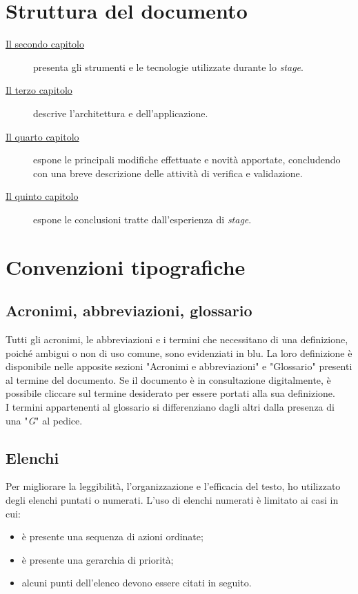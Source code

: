 \section{Struttura del documento}

\begin{description}
    \item[{\hyperref[cap:tecnologie-strumenti]{Il secondo capitolo}}] presenta gli strumenti e le tecnologie utilizzate durante lo \textit{stage}.
    
    \item[{\hyperref[cap:design]{Il terzo capitolo}}] descrive l'architettura e dell'applicazione.
    
    \item[{\hyperref[cap:codifica]{Il quarto capitolo}}] espone le principali modifiche effettuate e novità apportate, concludendo con una breve descrizione delle attività di verifica e validazione.
    
    \item[{\hyperref[cap:conclusioni]{Il quinto capitolo}}] espone le conclusioni tratte dall'esperienza di \textit{stage}.
\end{description}

\section{Convenzioni tipografiche}

\subsection{Acronimi, abbreviazioni, glossario}

Tutti gli acronimi, le abbreviazioni e i termini che necessitano di una definizione, poiché ambigui o non di uso comune, sono evidenziati in blu. La loro definizione è disponibile nelle apposite sezioni "Acronimi e abbreviazioni" e "Glossario" presenti al termine del documento. Se il documento è in consultazione digitalmente, è possibile cliccare sul termine desiderato per essere portati alla sua definizione.\\
I termini appartenenti al glossario si differenziano dagli altri dalla presenza di una "\textit{G}" al pedice.

\subsection{Elenchi}

Per migliorare la leggibilità, l'organizzazione e l'efficacia del testo, ho utilizzato degli elenchi puntati o numerati. L'uso di elenchi numerati è limitato ai casi in cui:
\begin{itemize}
    \item è presente una sequenza di azioni ordinate;
    \item è presente una gerarchia di priorità;
    \item alcuni punti dell'elenco devono essere citati in seguito.
\end{itemize}

